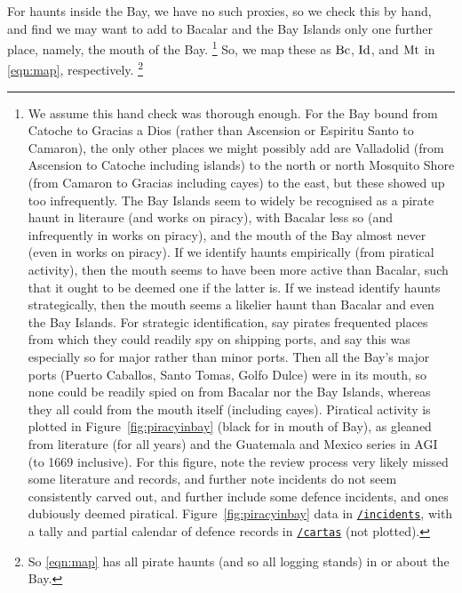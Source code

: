		For haunts inside the Bay, we have no such proxies, so we check this by hand, and find we may want to add to Bacalar and the Bay Islands only one further place, namely, the mouth of the Bay.%
		\footnote{We assume this hand check was thorough enough. For the Bay bound from Catoche to Gracias a Dios (rather than Ascension or Espiritu Santo to Camaron), the only other places we might possibly add are Valladolid (from Ascension to Catoche including islands) to the north or north Mosquito Shore (from Camaron to Gracias including cayes) to the east, but these showed up too infrequently. The Bay Islands seem to widely be recognised as a pirate haunt in literaure (and works on piracy), with Bacalar less so (and infrequently in works on piracy), and the mouth of the Bay almost never (even in works on piracy). If we identify haunts empirically (from piratical activity), then the mouth seems to have been more active than Bacalar, such that it ought to be deemed one if the latter is. If we instead identify haunts strategically, then the mouth seems a likelier haunt than Bacalar and even the Bay Islands. For strategic identification, say pirates frequented places from which they could readily spy on shipping ports, and say this was especially so for major rather than minor ports. Then all the Bay's major ports (Puerto Caballos, Santo Tomas, Golfo Dulce) were in its mouth, so none could be readily spied on from Bacalar nor the Bay Islands, whereas they all could from the mouth itself (including cayes). Piratical activity is plotted in Figure~\ref{fig:piracyinbay} (black for in mouth of Bay), as gleaned from literature (for all years) and the Guatemala and Mexico series in AGI (to 1669 inclusive). For this figure, note the review process very likely missed some literature and records, and further note incidents do not seem consistently carved out, and further include some defence incidents, and ones dubiously deemed piratical. Figure~\ref{fig:piracyinbay} data in \href{https://github.com/aenavidad/pp-0/tree/main/incidents}{\nolinkurl{/incidents}}, with a tally and partial calendar of defence records in \href{https://github.com/aenavidad/pp-0/tree/main/cartas}{\nolinkurl{/cartas}} (not plotted).}
		So, we map these as \(\operatorname{Bc}\), \(\operatorname{Id}\), and \(\operatorname{Mt}\) in \ref{eqn:map}, respectively.%
		\footnote{So \ref{eqn:map} has all pirate haunts (and so all logging stands) in or about the Bay.}
	

